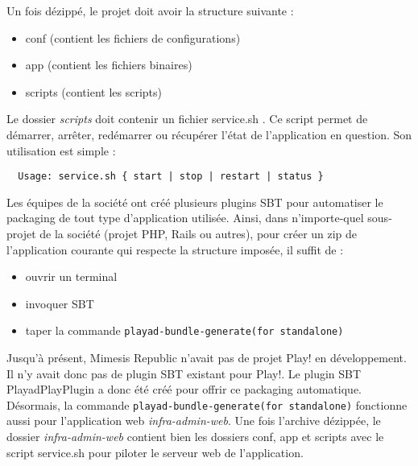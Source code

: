 Un fois dézippé, le projet doit avoir la structure suivante :
\begin{itemize}
\item[\textbullet] conf    (contient les fichiers de configurations)
\item[\textbullet] app     (contient les fichiers binaires)
\item[\textbullet] scripts (contient les scripts)
\end{itemize}

Le dossier \textit{scripts} doit contenir un fichier service.sh .
Ce script permet de démarrer, arrêter, redémarrer ou récupérer l'état de
l'application en question.
Son utilisation est simple :
\begin{lstlisting}
  Usage: service.sh { start | stop | restart | status }  
\end{lstlisting}

Les équipes de la société ont créé plusieurs plugins SBT pour automatiser le
packaging de tout type d'application utilisée.
Ainsi, dans n'importe-quel sous-projet de la société (projet PHP, Rails ou
autres), pour créer un zip de l'application courante qui respecte la
structure imposée, il suffit de :
\begin{itemize}
\item ouvrir un terminal
\item invoquer SBT 
\item taper la commande \verb?playad-bundle-generate(for standalone)? \\
\end{itemize}

Jusqu'à présent, Mimesis Republic n'avait pas de projet Play! en développement.
Il n'y avait donc pas de plugin SBT existant pour Play!. 
Le plugin SBT PlayadPlayPlugin a donc été créé pour offrir ce packaging 
automatique.
Désormais, la commande \verb?playad-bundle-generate(for standalone)? fonctionne
aussi pour l'application web \textit{infra-admin-web}.
Une fois l'archive dézippée, le dossier \textit{infra-admin-web} contient bien
les dossiers conf, app et scripts avec le script service.sh pour piloter le
serveur web de l'application.

